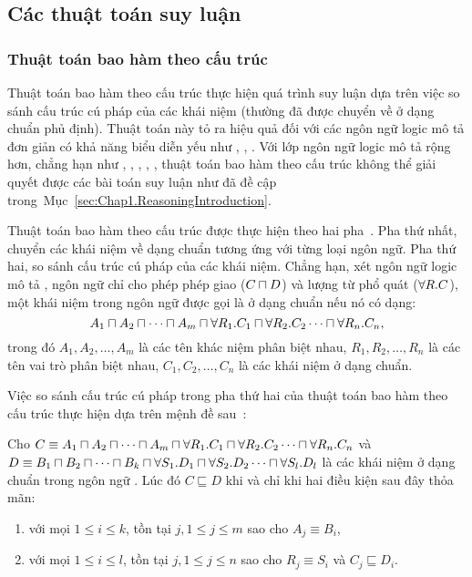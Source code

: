 \subsection{Các thuật toán suy luận}
\label{sec:Chap1.Algorithm}

\subsubsection{Thuật toán bao hàm theo cấu trúc}
\label{sec:Chap1.StructuralSubsumption}
Thuật toán bao hàm theo cấu trúc thực hiện quá trình suy luận dựa trên việc so sánh cấu trúc cú pháp của các khái niệm (thường đã được chuyển về ở dạng chuẩn phủ định). Thuật toán này tỏ ra hiệu quả đối với các ngôn ngữ logic mô tả đơn giản có khả năng biểu diễn yếu như \FLzero, \FLbot, \ALN. Với lớp ngôn ngữ logic mô tả rộng hơn, chẳng hạn như \ALC, \ALCI, \ALCIQ, \SHIQ, \SHOIQ, thuật toán bao hàm theo cấu trúc không thể giải quyết được các bài toán suy luận như đã đề cập trong~Mục~\ref{sec:Chap1.ReasoningIntroduction}.

Thuật toán bao hàm theo cấu trúc được thực hiện theo hai pha~\cite{DLHandbook2007}. Pha thứ nhất, chuyển các khái niệm về dạng chuẩn tương ứng với từng loại ngôn ngữ. Pha thứ hai, so sánh cấu trúc cú pháp của các khái niệm. Chẳng hạn, xét ngôn ngữ logic mô tả \FLzero, ngôn ngữ chỉ cho phép phép giao ($C \sqcap D$) và lượng từ phổ quát ($\forall R.C$), một khái niệm trong ngôn ngữ \FLzero được gọi là ở dạng chuẩn nếu nó có dạng:
$$A_1 \sqcap A_2 \sqcap \cdots \sqcap A_m \sqcap \forall R_1.C_1 \sqcap \forall R_2.C_2 \cdots \sqcap \forall R_n.C_n,$$
trong đó $A_1, A_2, \ldots, A_m$ là các tên khác niệm phân biệt nhau, $R_1, R_2, \ldots, R_n$ là các tên vai trò phân biệt nhau, $C_1, C_2, \ldots, C_n$ là các khái niệm ở dạng chuẩn.

Việc so sánh cấu trúc cú pháp trong pha thứ hai của thuật toán bao hàm theo cấu trúc thực hiện dựa trên mệnh đề sau~\cite{DLHandbook2007}:

\begin{Proposition}
	Cho $C \equiv A_1 \sqcap A_2 \sqcap \cdots \sqcap A_m \sqcap \forall R_1.C_1 \sqcap \forall R_2.C_2 \cdots \sqcap \forall R_n.C_n$ và $D \equiv B_1 \sqcap B_2 \sqcap \cdots \sqcap B_k \sqcap \forall S_1.D_1 \sqcap \forall S_2.D_2 \cdots \sqcap \forall S_l.D_l$ là các khái niệm ở dạng chuẩn trong ngôn ngữ \FLzero. Lúc đó $C \sqsubseteq D$ khi và chỉ khi hai điều kiện sau đây thỏa mãn:
	\begin{enumerate}
		\item với mọi $1 \leq i \leq k$, tồn tại $j, 1 \leq j \leq m$ sao cho $A_j \equiv B_i$,
		\item với mọi $1 \leq i \leq l$, tồn tại $j, 1 \leq j \leq n$ sao cho $R_j \equiv S_i$ và $C_j \sqsubseteq D_i$.
	\end{enumerate}	
\end{Proposition}

